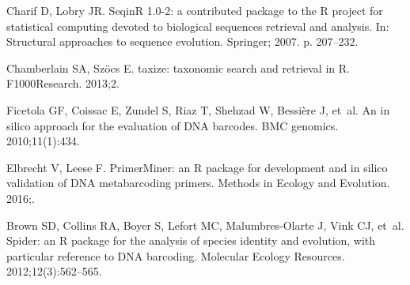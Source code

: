 \documentclass[10pt,letterpaper]{article}
\begin{document}
\begin{thebibliography}{10}
	Charif D, Lobry JR.
	\newblock SeqinR 1.0-2: a contributed package to the R project for statistical
	computing devoted to biological sequences retrieval and analysis.
	\newblock In: Structural approaches to sequence evolution. Springer; 2007. p.
	207--232.
	
	Chamberlain SA, Sz{\"o}cs E.
	\newblock taxize: taxonomic search and retrieval in R.
	\newblock F1000Research. 2013;2.
	
	Ficetola GF, Coissac E, Zundel S, Riaz T, Shehzad W, Bessi{\`e}re J, et~al.
	\newblock An in silico approach for the evaluation of DNA barcodes.
	\newblock BMC genomics. 2010;11(1):434.
	
	Elbrecht V, Leese F.
	\newblock PrimerMiner: an R package for development and in silico validation of
	DNA metabarcoding primers.
	\newblock Methods in Ecology and Evolution. 2016;.
	
	Brown SD, Collins RA, Boyer S, Lefort MC, Malumbres-Olarte J, Vink CJ, et~al.
	\newblock Spider: an R package for the analysis of species identity and
	evolution, with particular reference to DNA barcoding.
	\newblock Molecular Ecology Resources. 2012;12(3):562--565.
	
\end{thebibliography}
\end{document}
